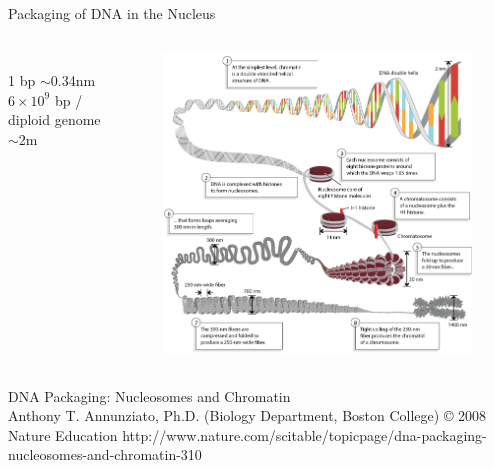 \documentclass[pdf]{beamer}
\begin{document}
\begin{frame}{Packaging of DNA in the Nucleus}
  \begin{columns}
    \begin{column}{0.35\textwidth}
      \footnotesize{
        \\
        1 bp $\sim$0.34nm\\
        $6 \times 10^9$ bp / diploid genome\\
        $\sim$2m
      }
    \end{column}
    \begin{column}{0.65\textwidth}
      \begin{figure}[ht]
        \includegraphics[width=\textwidth]{images/DNA_chromatin}
      \end{figure}
    \end{column}
  \end{columns}
  {\tiny 
  \linespread{0.5}
  DNA Packaging: Nucleosomes and Chromatin\\
  Anthony T. Annunziato, Ph.D. (Biology Department, Boston College) © 2008 Nature Education 
  http://www.nature.com/scitable/topicpage/dna-packaging-nucleosomes-and-chromatin-310
  \par
  }
\end{frame}

\end{document}
